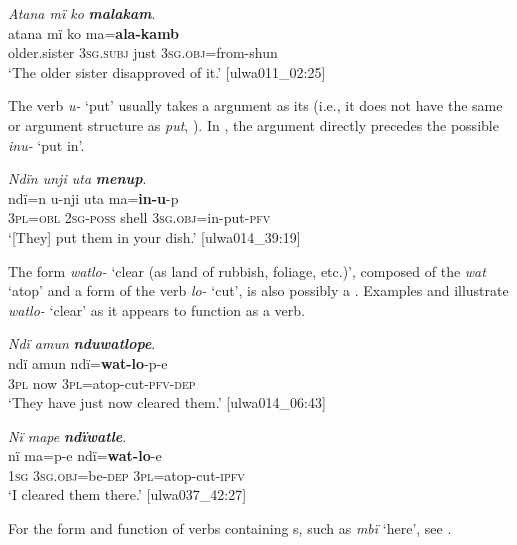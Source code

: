 \ea%
    \label{ex:verbs:106}
          \textit{Atana mï ko} \textbf{\textit{malakam}}.\\
\gll atana    mï      ko    ma=\textbf{ala-kamb}\\
    older.sister  3\textsc{sg.subj}  just    3\textsc{sg.obj}=from-shun\\
\glt `The older sister disapproved of it.’ [ulwa011\_02:25]
\z

The verb \textit{u-} ‘put’ usually takes a  argument as its  (i.e., it does not have the same  or argument structure as  \textit{put}, ). In , the  argument directly precedes the possible  \textit{inu-} ‘put in’.

\ea%
    \label{ex:verbs:107}
          \textit{Ndïn unji uta} \textbf{\textit{menup}}.\\
\gll ndï=n    u-nji    uta    ma=\textbf{in-u}{}-p\\
    \textsc{3pl=obl}  2\textsc{sg-poss}  shell  3\textsc{sg.obj}=in-put-\textsc{pfv}\\
\glt `[They] put them in your dish.’ [ulwa014\_39:19]
\z

The form \textit{watlo-} ‘clear (as land of rubbish, foliage, etc.)’, composed of the  \textit{wat} ‘atop’ and a form of the verb \textit{lo-} ‘cut’, is also possibly a . Examples  and  illustrate \textit{watlo-} ‘clear’ as it appears to function as a  verb.

\ea%
    \label{ex:verbs:108}
          \textit{Ndï amun} \textbf{\textit{nduwatlope}}.\\
\gll ndï  amun  ndï=\textbf{wat-lo}{}-p-e\\
    3\textsc{pl}  now  3\textsc{pl}=atop-cut-\textsc{pfv-dep}\\
\glt `They have just now cleared them.’ [ulwa014\_06:43]
\z

\ea%
    \label{ex:verbs:109}
          \textit{Nï mape} \textbf{\textit{ndïwatle}}.\\
\gll nï    ma=p-e      ndï=\textbf{wat-lo}{}-e\\
    1\textsc{sg}  3\textsc{sg.obj}=be\textsc{{}-dep} 3\textsc{pl}=atop-cut-\textsc{ipfv}\\
\glt `I cleared them there.’ [ulwa037\_42:27]
\z

For the form and function of  verbs containing s, such as \textit{mbï} ‘here’, see .

